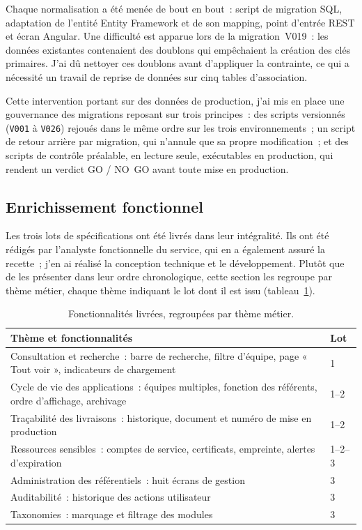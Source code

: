 Chaque normalisation a été menée de bout en bout~: script de migration SQL,
adaptation de l'entité Entity Framework et de son mapping, point d'entrée REST
et écran Angular. Une difficulté est apparue lors de la migration~V019~: les
données existantes contenaient des doublons qui empêchaient la création des clés
primaires. J'ai dû nettoyer ces doublons avant d'appliquer la contrainte, ce
qui a nécessité un travail de reprise de données sur cinq tables d'association.

Cette intervention portant sur des données de production, j'ai mis en place une
gouvernance des migrations reposant sur trois principes~: des scripts versionnés
(\texttt{V001} à \texttt{V026}) rejoués dans le même ordre sur les trois
environnements~; un script de retour arrière par migration, qui n'annule que sa
propre modification~; et des scripts de contrôle préalable, en lecture seule,
exécutables en production, qui rendent un verdict GO / NO~GO avant toute mise en
production.

\subsection{Enrichissement fonctionnel}
\label{sec:fonctionnel}

Les trois lots de spécifications ont été livrés dans leur intégralité. Ils ont
été rédigés par l'analyste fonctionnelle du service, qui en a également assuré
la recette~; j'en ai réalisé la conception technique et le développement. Plutôt
que de les présenter dans leur ordre chronologique, cette section les regroupe
par thème métier, chaque thème indiquant le lot dont il est issu
(tableau~\ref{tab:themes}).

\begin{table}[H]
  \centering
  \caption{Fonctionnalités livrées, regroupées par thème métier.}
  \label{tab:themes}
  \small
  \begin{tabularx}{\textwidth}{@{}Xl@{}}
    \toprule
    \textbf{Thème et fonctionnalités} & \textbf{Lot} \\
    \midrule
    Consultation et recherche~: barre de recherche, filtre d'équipe, page « Tout voir », indicateurs de chargement & 1 \\
    Cycle de vie des applications~: équipes multiples, fonction des référents, ordre d'affichage, archivage & 1--2 \\
    Traçabilité des livraisons~: historique, document et numéro de mise en production & 1--2 \\
    Ressources sensibles~: comptes de service, certificats, empreinte, alertes d'expiration & 1--2--3 \\
    Administration des référentiels~: huit écrans de gestion & 3 \\
    Auditabilité~: historique des actions utilisateur & 3 \\
    Taxonomies~: marquage et filtrage des modules & 3 \\
    \bottomrule
  \end{tabularx}
\end{table}


